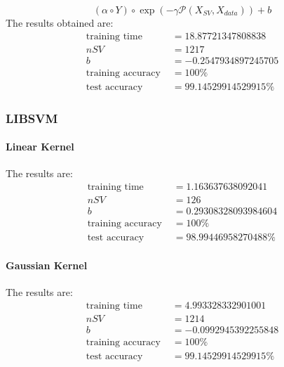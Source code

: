 \documentclass[11pt]{article}
\begin{document}
\begin{equation}
  (\alpha \circ Y) \circ \exp(-\gamma \mathcal{P}(X_{SV}, X_{data})) + b
\end{equation}
The results obtained are:
\begin{equation}
  \begin{split}
    \text{training time }&= 18.87721347808838\\
    nSV &= 1217\\
    b &= -0.2547934897245705\\
    \text{training accuracy }&= 100\%\\
    \text{test accuracy }&= 99.14529914529915\%
  \end{split}
\end{equation}

\subsubsection{LIBSVM}

\paragraph{Linear Kernel}
The results are:
\begin{equation}
  \begin{split}
    \text{training time }&= 1.163637638092041\\
    nSV &= 126\\
    b &= 0.29308328093984604\\
    \text{training accuracy }&= 100\%\\
    \text{test accuracy }&= 98.99446958270488\%
  \end{split}
\end{equation}

\paragraph{Gaussian Kernel}
The results are:
\begin{equation}
  \begin{split}
    \text{training time }&= 4.993328332901001\\
    nSV &= 1214\\
    b &= -0.0992945392255848\\
    \text{training accuracy }&= 100\%\\
    \text{test accuracy }&= 99.14529914529915\%
  \end{split}
\end{equation}
\end{document}
